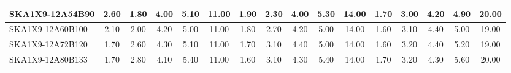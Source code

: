 \begin{table}[H]
{{\begin{tabular}{|lccccc||ccccc||ccccc|}
SKA1X9-12A54B90 & 2.60 \cellcolor{blue!52.36} & 1.80 \cellcolor{red!18.00} & 4.00 \cellcolor{green!28.50} & 5.10 \cellcolor{orange!39.00} & 11.00 \cellcolor{purple!60.00} & 1.90 \cellcolor{blue!30.60} & 2.30 \cellcolor{red!18.00} & 4.00 \cellcolor{green!18.00} & 5.30 \cellcolor{orange!53.00} & 14.00 \cellcolor{purple!60.00} & 1.70 \cellcolor{blue!22.20} & 3.00 \cellcolor{red!18.00} & 4.20 \cellcolor{green!39.00} & 4.90 \cellcolor{orange!27.33} & 20.00 \cellcolor{purple!60.00}\\ \hline 
SKA1X9-12A60B100 & 2.10 \cellcolor{blue!33.27} & 2.00 \cellcolor{red!25.00} & 4.20 \cellcolor{green!49.50} & 5.00 \cellcolor{orange!32.00} & 11.00 \cellcolor{purple!60.00} & 1.80 \cellcolor{blue!26.40} & 2.70 \cellcolor{red!39.00} & 4.20 \cellcolor{green!39.00} & 5.00 \cellcolor{orange!32.00} & 14.00 \cellcolor{purple!60.00} & 1.60 \cellcolor{blue!18.00} & 3.10 \cellcolor{red!39.00} & 4.40 \cellcolor{green!60.00} & 5.00 \cellcolor{orange!32.00} & 19.00 \cellcolor{purple!39.00}\\ \hline 
SKA1X9-12A72B120 & 1.70 \cellcolor{blue!18.00} & 2.60 \cellcolor{red!46.00} & 4.30 \cellcolor{green!60.00} & 5.10 \cellcolor{orange!39.00} & 11.00 \cellcolor{purple!60.00} & 1.70 \cellcolor{blue!22.20} & 3.10 \cellcolor{red!60.00} & 4.40 \cellcolor{green!60.00} & 5.00 \cellcolor{orange!32.00} & 14.00 \cellcolor{purple!60.00} & 1.60 \cellcolor{blue!18.00} & 3.20 \cellcolor{red!60.00} & 4.40 \cellcolor{green!60.00} & 5.20 \cellcolor{orange!41.33} & 19.00 \cellcolor{purple!39.00}\\ \hline 
SKA1X9-12A80B133 & 1.70 \cellcolor{blue!18.00} & 2.80 \cellcolor{red!53.00} & 4.10 \cellcolor{green!39.00} & 5.40 \cellcolor{orange!60.00} & 11.00 \cellcolor{purple!60.00} & 1.60 \cellcolor{blue!18.00} & 3.10 \cellcolor{red!60.00} & 4.30 \cellcolor{green!49.50} & 5.40 \cellcolor{orange!60.00} & 14.00 \cellcolor{purple!60.00} & 1.70 \cellcolor{blue!22.20} & 3.20 \cellcolor{red!60.00} & 4.30 \cellcolor{green!49.50} & 5.60 \cellcolor{orange!60.00} & 20.00 \cellcolor{purple!60.00}\\ \hline 
\end{tabular}}
\vspace{-0.300000cm}
\hspace{1cm} 
}
\end{table}

